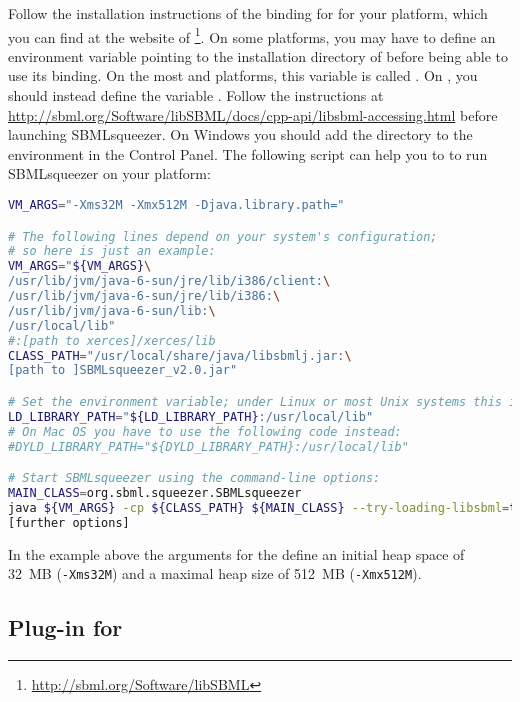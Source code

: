 Follow the installation instructions of the \Java binding for \libSBML for your
platform, which you can find at the website of
\libSBML\footnote{\url{http://sbml.org/Software/libSBML}}.
On some platforms, you may have to define an environment variable pointing
to the installation directory of \libSBML before being able to use its \Java
binding.
On the most \Unix and \Linux platforms, this variable is called
\LDLIBRARYPATH.
On \MacOSX, you should instead define the variable \DYLDLIBRARYPATH.
Follow the instructions at
\href{http://sbml.org/Software/libSBML/docs/cpp-api/libsbml-accessing.html#accessing-java}{\url{http://sbml.org/Software/libSBML/docs/cpp-api/libsbml-accessing.html}}
before launching SBMLsqueezer.
On Windows you should add the directory to the \PATH environment in the Control Panel.
The following script can help you to to run SBMLsqueezer on your \Unix platform:
\begin{lstlisting}[language=bash]
VM_ARGS="-Xms32M -Xmx512M -Djava.library.path="

# The following lines depend on your system's configuration; 
# so here is just an example:
VM_ARGS="${VM_ARGS}\
/usr/lib/jvm/java-6-sun/jre/lib/i386/client:\
/usr/lib/jvm/java-6-sun/jre/lib/i386:\
/usr/lib/jvm/java-6-sun/lib:\
/usr/local/lib"
#:[path to xerces]/xerces/lib
CLASS_PATH="/usr/local/share/java/libsbmlj.jar:\
[path to ]SBMLsqueezer_v2.0.jar"

# Set the environment variable; under Linux or most Unix systems this is
LD_LIBRARY_PATH="${LD_LIBRARY_PATH}:/usr/local/lib"
# On Mac OS you have to use the following code instead:
#DYLD_LIBRARY_PATH="${DYLD_LIBRARY_PATH}:/usr/local/lib"

# Start SBMLsqueezer using the command-line options:
MAIN_CLASS=org.sbml.squeezer.SBMLsqueezer 
java ${VM_ARGS} -cp ${CLASS_PATH} ${MAIN_CLASS} --try-loading-libsbml=true\
[further options]
\end{lstlisting}
In the example above the arguments for the \JVM define an initial heap space of
32~MB (\texttt{-Xms32M}) and a maximal heap size of 512~MB (\texttt{-Xmx512M}).

\subsection{Plug-in for \CellDesigner}
\label{sec:CellDesignerInstall}

